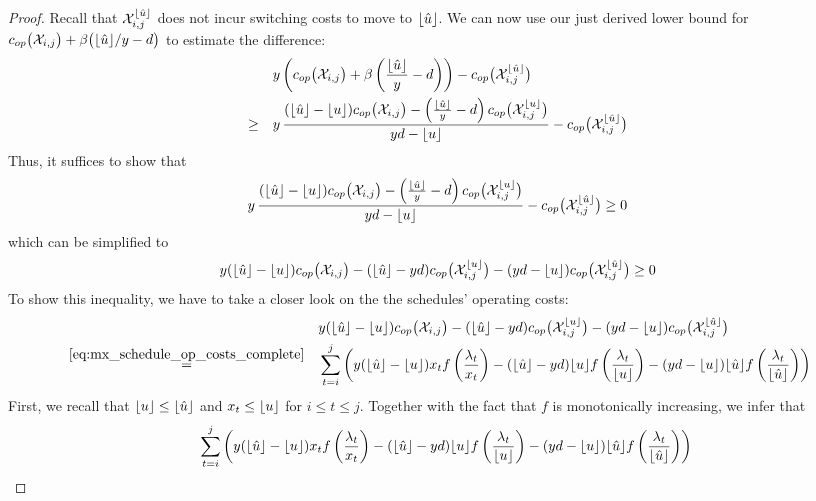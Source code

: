 \begin{proof}
Recall that $\mathcal{X}_{i,j}^{\lfloor\hat{u}\rfloor}$ does not incur switching costs to move to $\lfloor\hat{u}\rfloor$. We can now use our just derived lower bound for $c_{op}\bigl(\mathcal{X}_{i,j}\bigr)+\beta\bigl(\lfloor\hat{u}\rfloor/y-d\bigr)$ to estimate the difference:
\begin{align*}
	&y\left(c_{op}\bigl(\mathcal{X}_{i,j}\bigr)+\beta\left(\frac{\lfloor\hat{u}\rfloor}{y}-d\right)\right)-c_{op}\bigl(\mathcal{X}_{i,j}^{\lfloor\hat{u}\rfloor}\bigr)\\
	\ge\quad&y\, \frac{(\lfloor\hat{u}\rfloor-\lfloor u\rfloor)c_{op}\bigl(\mathcal{X}_{i,j}\bigr)-\left(\frac{\lfloor\hat{u}\rfloor}{y}-d\right)c_{op}\bigl(\mathcal{X}_{i,j}^{\lfloor u\rfloor}\bigr)}{yd-\lfloor u\rfloor}-c_{op}\bigl(\mathcal{X}_{i,j}^{\lfloor\hat{u}\rfloor}\bigr)
\end{align*}
Thus, it suffices to show that
\begin{align*}
	y\,\frac{(\lfloor\hat{u}\rfloor-\lfloor u\rfloor)c_{op}\bigl(\mathcal{X}_{i,j}\bigr)-\left(\frac{\lfloor\hat{u}\rfloor}{y}-d\right)c_{op}\bigl(\mathcal{X}_{i,j}^{\lfloor u\rfloor}\bigr)}{yd-\lfloor u\rfloor}-c_{op}\bigl(\mathcal{X}_{i,j}^{\lfloor\hat{u}\rfloor}\bigr)\ge 0
\end{align*}
which can be simplified to
\begin{equation*}
	y(\lfloor\hat{u}\rfloor-\lfloor u\rfloor)c_{op}\bigl(\mathcal{X}_{i,j}\bigr)-(\lfloor\hat{u}\rfloor-yd)c_{op}\bigl(\mathcal{X}_{i,j}^{\lfloor u\rfloor}\bigr)-(yd-\lfloor u\rfloor)c_{op}\bigl(\mathcal{X}_{i,j}^{\lfloor\hat{u}\rfloor}\bigr)\ge 0
\end{equation*}
To show this inequality, we have to take a closer look on the the schedules' operating costs:
\begin{align*}
	&&&y(\lfloor\hat{u}\rfloor-\lfloor u\rfloor)c_{op}\bigl(\mathcal{X}_{i,j}\bigr)-(\lfloor\hat{u}\rfloor-yd)c_{op}\bigl(\mathcal{X}_{i,j}^{\lfloor u\rfloor}\bigr)-(yd-\lfloor u\rfloor)c_{op}\bigl(\mathcal{X}_{i,j}^{\lfloor\hat{u}\rfloor}\bigr)\\
	&\stackrel{\eqref{eq:mx_schedule_op_costs_complete}}{=}&&\sum\limits_{t=i}^j\left(y(\lfloor\hat{u}\rfloor-\lfloor u\rfloor)x_tf\left(\frac{\lambda_t}{x_t}\right)-(\lfloor\hat{u}\rfloor-yd)\lfloor u\rfloor f\left(\frac{\lambda_t}{\lfloor u\rfloor}\right)-(yd-\lfloor u\rfloor)\lfloor\hat{u}\rfloor f\left(\frac{\lambda_t}{\lfloor\hat{u}\rfloor}\right)\right)
\end{align*}
First, we recall that $\lfloor u\rfloor\le\lfloor\hat{u}\rfloor$ and $x_t\le\lfloor u\rfloor$ for $i\le t\le j$. Together with the fact that $f$ is monotonically increasing, we infer that
\begin{align*}
	&&&\sum\limits_{t=i}^j\left(y(\floor{\hat{u}}-\floor{u})x_tf\left(\frac{\lambda_t}{x_t}\right)-(\floor{\hat{u}}-yd)\floor{u}f\left(\frac{\lambda_t}{\floor{u}}\right)-(yd-\floor{u})\floor{\hat{u}}f\left(\frac{\lambda_t}{\floor{\hat{u}}}\right)\right)\\

\end{align*}
\end{proof}
